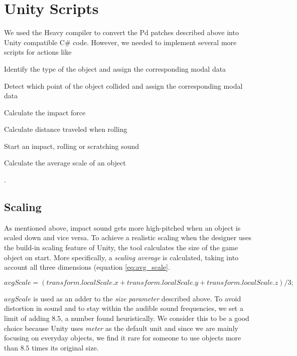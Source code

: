 \section{Unity Scripts}
We used the Heavy \cite{bib:heavy} compiler to convert the Pd patches described above into Unity compatible C\# code. However, we needed to implement several more scripts for actions like 
\begin{inparaenum}[1)]
\item Identify the type of the object and assign the corresponding modal data
\item Detect which point of the object collided and assign the corresponding modal data
\item Calculate the impact force
\item Calculate distance traveled when rolling
\item Start an impact, rolling or scratching sound 
\item Calculate the average scale of an object
\end{inparaenum}.   

\subsection{Scaling}
As mentioned above, impact sound gets more high-pitched when an object is scaled down and vice versa. To achieve a realistic scaling when the designer uses the build-in scaling feature of Unity\textregistered, the tool calculates the size of the game object on start. More specifically, a \textit{scaling average} is calculated, taking into account all three dimensions (equation \ref{eq:avg_scale}.

\begin{equation}\label{eq:avg_scale}
avgScale = (transform.localScale.x + transform.localScale.y + transform.localScale.z) / 3;
\end{equation}

$avgScale$ is used as an adder to the \textit{size parameter} described above. To avoid distortion in sound and to stay within the audible sound frequencies, we set a limit of adding $8.5$, a number found heuristically. We consider this to be a good choice because Unity uses \textit{meter} as the default unit and since we are mainly focusing on everyday objects, we find it rare for someone to use objects more than $8.5$ times its original size.

